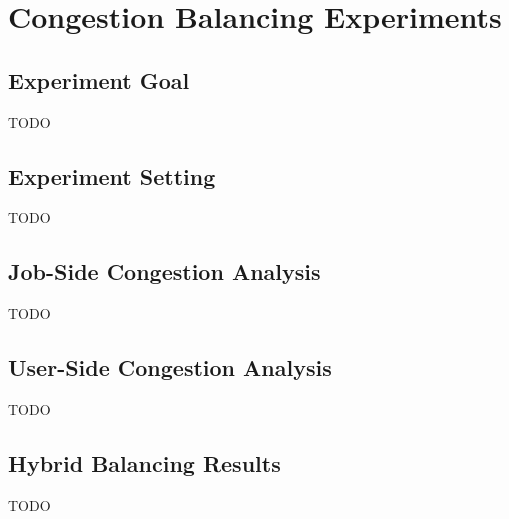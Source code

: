 \section{Congestion Balancing Experiments}
\label{sec:exp_congestion}

\subsection{Experiment Goal}
\label{sec:exp_congestion_goal}

TODO

\subsection{Experiment Setting}
\label{sec:exp_congestion_setting}

TODO

\subsection{Job-Side Congestion Analysis}
\label{sec:exp_job_congestion}

TODO

\subsection{User-Side Congestion Analysis}
\label{sec:exp_user_congestion}

TODO

\subsection{Hybrid Balancing Results}
\label{sec:exp_hybrid_results}

TODO